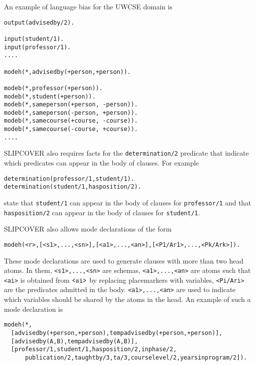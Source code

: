 \documentclass[a4paper,10pt]{article}
\begin{document}
An example of language bias for the UWCSE domain is
\begin{verbatim}
output(advisedby/2).

input(student/1).
input(professor/1).
....

modeh(*,advisedby(+person,+person)). 

modeb(*,professor(+person)).
modeb(*,student(+person)).
modeb(*,sameperson(+person, -person)). 
modeb(*,sameperson(-person, +person)). 
modeb(*,samecourse(+course, -course)). 
modeb(*,samecourse(-course, +course)). 
....
\end{verbatim}
SLIPCOVER also requires facts for the \verb|determination/2| predicate that indicate which predicates can appear in the body of clauses. 
For example
\begin{verbatim}
determination(professor/1,student/1).
determination(student/1,hasposition/2).
\end{verbatim}
state that \verb|student/1| can appear in the body of clauses for \verb|professor/1| and that \verb|hasposition/2| can appear in 
the body of clauses for \verb|student/1|.

SLIPCOVER also allows mode declarations of the form
\begin{verbatim}
modeh(<r>,[<s1>,...,<sn>],[<a1>,...,<an>],[<P1/Ar1>,...,<Pk/Ark>]). 
\end{verbatim}
These mode declarations are used to generate clauses with more than two head atoms. In them, \verb|<s1>,...,<sn>| are schemas,  \verb|<a1>,...,<an>| are atoms such that \verb|<ai>| is obtained from $\verb|<si>|$ by replacing placemarkers with variables, 
\verb|<Pi/Ari>| are the predicates admitted in the body. \verb|<a1>,...,<an>| are used to indicate which variables should be shared by the atoms in the head.
An example of such a mode declaration is
\begin{verbatim}
modeh(*,
  [advisedby(+person,+person),tempadvisedby(+person,+person)],
  [advisedby(A,B),tempadvisedby(A,B)],
  [professor/1,student/1,hasposition/2,inphase/2,
	  publication/2,taughtby/3,ta/3,courselevel/2,yearsinprogram/2]).
\end{verbatim}
\end{document}
